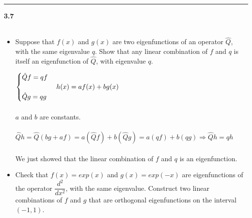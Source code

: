 \documentclass[fleqn]{article}
\begin{document}
  \rule{15cm}{1pt}

  \textbf{3.7} \\ \\
  \begin{itemize}
    \item Suppose that $f(x)$ and $g(x)$ are two eigenfunctions of an operator $\hat{Q}$,
    with the same eigenvalue $q$. Show that any linear combination of $f$ and $q$ is
    itself an eigenfunction of $\hat{Q}$, with eigenvalue $q$.

      \textcolor{hwColor}{
        $
          \begin{cases}
            \hat{Q} f=qf \\
            \\
            \hat{Q} g=qg
          \end{cases} 
          \\
          \\
          h(x)=af(x)+bg(x)
        $ \\
        \\
        $a$ and $b$ are constants. \\
        \\
        $
          \hat{Q} h= \hat{Q} \left(bg+af\right)=a \left(\hat{Q} f\right)+b \left(\hat{Q} g\right)=a(qf)+b(qg) 
          \Longrightarrow \hat{Q} h=qh 
        $ \\
        \\
        We just showed that the linear combination of $f$ and $q$ is an eigenfunction. \\
      }


    \item Check that $f(x)=exp(x)$ and $g(x)=exp(-x)$ are eigenfunctions of
    the operator $\dfrac{d^2}{dx^2}$, with the same eigenvalue. Construct two linear
    combinations of $f$ and $g$ that are orthogonal eigenfunctions on the interval $(-1,1)$.


\end{itemize}
\end{document}
